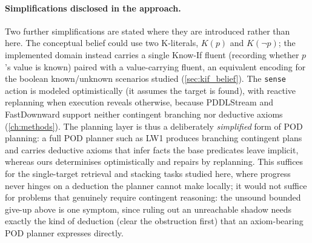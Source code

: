 \paragraph{Simplifications disclosed in the approach.} Two further
simplifications are stated where they are introduced rather than here. The
conceptual belief could use two K-literals, $K(p)$ and $K(\neg p)$; the
implemented domain instead carries a single Know-If fluent (recording whether
$p$'s value is known) paired with a value-carrying fluent, an equivalent
encoding for the boolean known/unknown scenarios studied (\cref{sec:kif_belief}). The \texttt{sense} action is modeled
optimistically (it assumes the target is found), with reactive
replanning when execution reveals otherwise, because PDDLStream and
FastDownward support neither contingent branching nor deductive axioms
(\cref{ch:methods}). The planning layer is thus a deliberately
\emph{simplified} form of POD planning: a full POD planner such as LW1
\cite{bonet2014flexible} produces branching contingent plans and carries
deductive axioms that infer facts the base predicates leave implicit,
whereas ours determinises optimistically and repairs by replanning. This
suffices for the single-target retrieval and stacking tasks studied here,
where progress never hinges on a deduction the planner cannot make locally;
it would not suffice for problems that genuinely require contingent
reasoning: the unsound bounded give-up above is one symptom, since ruling
out an unreachable shadow needs exactly the kind of deduction (clear the
obstruction first) that an axiom-bearing POD planner expresses directly.
